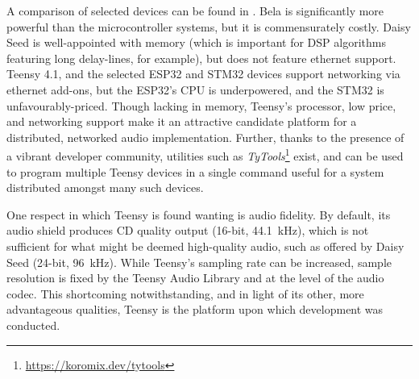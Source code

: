 A comparison of selected devices can be found in
.
Bela is significantly more powerful than the microcontroller systems, but it is
commensurately costly.
Daisy Seed is well-appointed with memory (which is important for DSP algorithms
featuring long delay-lines, for example), but does not feature ethernet support.
Teensy 4.1, and the selected ESP32 and STM32 devices support networking via
ethernet add-ons, but the ESP32's CPU is underpowered, and the STM32 is
unfavourably-priced.
Though lacking in memory, Teensy's processor, low price, and networking support
make it an attractive candidate platform for a distributed, networked audio
implementation.
Further, thanks to the presence of a vibrant developer community, utilities such
as \textit{TyTools}\footnote{\url{https://koromix.dev/tytools}} exist, and can
be used to program multiple Teensy devices in a single command \textemdash{}
useful for a system distributed amongst many such devices.

One respect in which Teensy is found wanting is audio fidelity.
By default, its audio shield produces CD quality output (16-bit,
\qty{44.1}{\kHz}), which is not sufficient for what might be deemed high-quality
audio, such as offered by Daisy Seed (24-bit, \qty{96}{\kHz}).
While Teensy's sampling rate can be increased, sample resolution is fixed by
the Teensy Audio Library and at the level of the audio codec.
This shortcoming notwithstanding, and in light of its other, more advantageous
qualities, Teensy is the platform upon which development was conducted.
